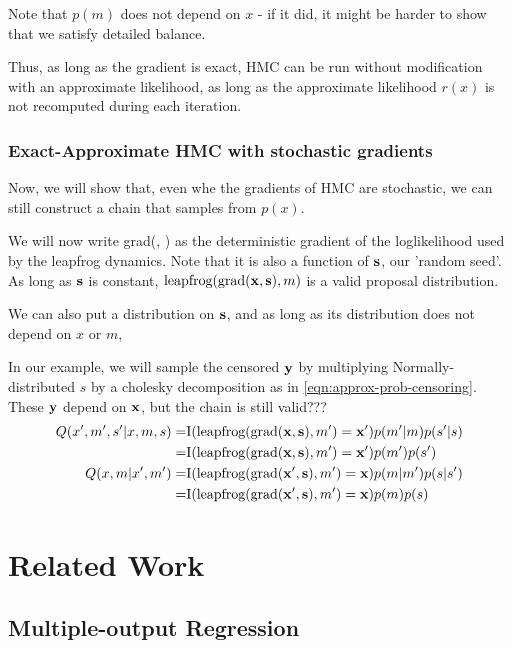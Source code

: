 \documentclass{article}
\begin{document}
Note that $p(m)$ does not depend on $x$ - if it did, it might be harder to show that we satisfy detailed balance.

Thus, as long as the gradient is exact, HMC can be run without modification with an approximate likelihood, as long as the approximate likelihood $r(x)$ is not recomputed during each iteration.

\subsubsection{Exact-Approximate HMC with stochastic gradients}

Now, we will show that, even whe the gradients of HMC are stochastic, we can still construct a chain that samples from $p(x)$.

We will now write \textrm{grad}(\vx, \vs) as the deterministic gradient of the loglikelihood used by the leapfrog dynamics.  Note that it is also a function of ${\bf{s}}$, our 'random seed'.  As long as ${\bf{s}}$ is constant, $\textrm{leapfrog}( \textrm{grad}({\bf{x}}, {\bf{s}}), m)$ is a valid proposal distribution.

We can also put a distribution on ${\bf{s}}$, and as long as its distribution does not depend on $x$ or $m$, 

In our example, we will sample the censored ${\bf{y}}$ by multiplying Normally-distributed $s$ by a cholesky decomposition as in \eqref{eqn:approx-prob-censoring}.  These ${\bf{y}}$ depend on ${\bf{x}}$, but the chain is still valid???
%
\begin{align}
Q( x', m', s'| x, m, s ) = & \textrm{I}( \textrm{leapfrog}( \textrm{grad}({\bf{x}}, {\bf{s}}), m') = {\bf{x}}' )p(m'|m)p(s'|s) \\
= & \textrm{I}( \textrm{leapfrog}( \textrm{grad}({\bf{x}}, {\bf{s}}), m') = {\bf{x}}' )p(m') p(s')\\
Q( x, m | x', m' ) = & \textrm{I}( \textrm{leapfrog}( \textrm{grad}({\bf{x}}', {\bf{s}}), m') = {\bf{x}} )p(m|m')p(s|s') \\
= & \textrm{I}( \textrm{leapfrog}( \textrm{grad}({\bf{x}}', {\bf{s}}), m') = {\bf{x}} )p(m) p(s) \\
\end{align}

\section{Related Work}

\subsection{Multiple-output Regression}
\end{document}
